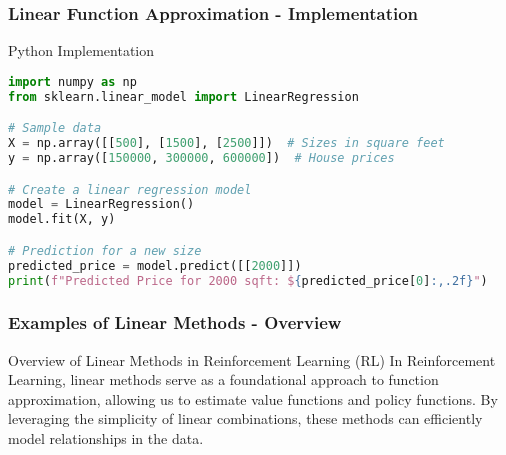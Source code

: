 \documentclass[aspectratio=169]{beamer}
\begin{document}
\begin{frame}[fragile]
    \frametitle{Linear Function Approximation - Implementation}
    \begin{block}{Python Implementation}
        \begin{lstlisting}[language=Python]
import numpy as np
from sklearn.linear_model import LinearRegression

# Sample data
X = np.array([[500], [1500], [2500]])  # Sizes in square feet
y = np.array([150000, 300000, 600000])  # House prices

# Create a linear regression model
model = LinearRegression()
model.fit(X, y)

# Prediction for a new size
predicted_price = model.predict([[2000]])
print(f"Predicted Price for 2000 sqft: ${predicted_price[0]:,.2f}")
        \end{lstlisting}
    \end{block}
\end{frame}

\begin{frame}[fragile]
    \frametitle{Examples of Linear Methods - Overview}
    \begin{block}{Overview of Linear Methods in Reinforcement Learning (RL)}
        In Reinforcement Learning, linear methods serve as a foundational approach to function approximation, allowing us to estimate value functions and policy functions. By leveraging the simplicity of linear combinations, these methods can efficiently model relationships in the data.
    \end{block}
\end{frame}
\end{document}
